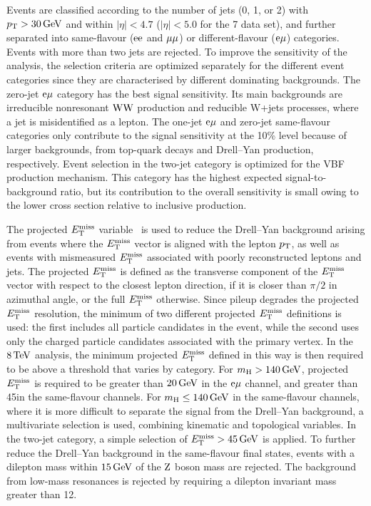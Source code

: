 \documentclass[11pt,twoside,a4paper,cmspaper,final]{cms-tdr}
\begin{document}
Events are classified according to the number of jets (0, 1, or 2)
with $p_{\mathrm{T}}>30\,\text{Ge\hspace{-.08em}V}$ and within $|\eta|<4.7$ ($|\eta|<5.0$ for the 7\TeV
data set), and further separated into same-flavour ($\mathrm{e}\mathrm{e}$ and ${\mu}{\mu}$)
or different-flavour ($\mathrm{e}{\mu}$) categories.  Events with more than
two jets are rejected.  To improve the sensitivity of the analysis,
the selection criteria are optimized separately for the different
event categories since they are characterised by different dominating
backgrounds.  The zero-jet $\mathrm{e}{\mu}$ category has the best signal
sensitivity.  Its main backgrounds are irreducible nonresonant $\mathrm{W}\mathrm{W}$
production and reducible W+jets processes, where a jet is
misidentified as a lepton.
The one-jet $\mathrm{e}{\mu}$ and zero-jet same-flavour categories
only contribute to the signal sensitivity at the 10\% level because
of larger backgrounds, from top-quark decays and
Drell--Yan production, respectively.  Event selection in the two-jet
category is optimized for the VBF production mechanism.  This
category has the highest expected signal-to-background ratio, but its
contribution to the overall sensitivity is small owing to the
lower cross section relative to inclusive production.

The projected $E_{\mathrm{T}}^{\text{miss}}$ variable~\cite{Chatrchyan:2012ty} is
used to reduce the Drell--Yan background arising from events where the
$E_{\mathrm{T}}^{\text{miss}}$ vector is aligned with the lepton $p_{\mathrm{T}}$, as well as events with
mismeasured $E_{\mathrm{T}}^{\text{miss}}$ associated with poorly reconstructed leptons and jets.
The projected $E_{\mathrm{T}}^{\text{miss}}$ is defined as the transverse component of the $E_{\mathrm{T}}^{\text{miss}}$
vector with respect to the closest lepton direction, if it is closer than
$\pi/2$ in azimuthal angle, or the full $E_{\mathrm{T}}^{\text{miss}}$ otherwise.  Since pileup degrades the
projected $E_{\mathrm{T}}^{\text{miss}}$ resolution, the minimum of
two different projected $E_{\mathrm{T}}^{\text{miss}}$ definitions is used: the first includes
all particle candidates in the event, while the second uses only the charged
particle candidates associated with the primary vertex.  In the $8\,\text{Te\hspace{-.08em}V}$
analysis, the minimum projected $E_{\mathrm{T}}^{\text{miss}}$ defined in this way is then
required to be above a threshold that varies by category.  For $m_{\mathrm{H}}>140\,\text{Ge\hspace{-.08em}V}$,
projected $E_{\mathrm{T}}^{\text{miss}}$ is required to be greater than $20\,\text{Ge\hspace{-.08em}V}$ in the $\mathrm{e}{\mu}$
channel, and greater than 45\GeV in the same-flavour channels.  For
$m_{\mathrm{H}} \le 140\,\text{Ge\hspace{-.08em}V}$ in the same-flavour channels, where it is more difficult
to separate the signal from the Drell--Yan background, a
multivariate selection is used, combining kinematic and topological variables.
In the two-jet category, a simple selection of $E_{\mathrm{T}}^{\text{miss}}>45\,\text{Ge\hspace{-.08em}V}$ is applied.
To further reduce the Drell--Yan background in the same-flavour final states,
events with a dilepton mass within $15\,\text{Ge\hspace{-.08em}V}$ of the $\mathrm{Z}$ boson mass are
rejected. The background from low-mass resonances is rejected by requiring a dilepton
invariant mass greater than 12\GeV.
\end{document}
